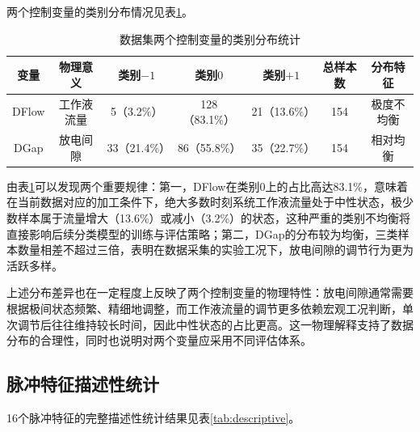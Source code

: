 \documentclass[UTF8,a4paper,12pt]{ctexart}
\begin{document}
两个控制变量的类别分布情况见表\ref{tab:distribution}。

\begin{table}[H]
\centering
\caption{数据集两个控制变量的类别分布统计}
\label{tab:distribution}
\begin{tabular}{ccccccc}
\toprule
变量 & 物理意义 & 类别$-1$ & 类别$0$ & 类别$+1$ & 总样本数 & 分布特征 \\
\midrule
DFlow & 工作液流量 & 5（3.2\%） & 128（83.1\%） & 21（13.6\%） & 154 & 极度不均衡 \\
DGap  & 放电间隙 & 33（21.4\%） & 86（55.8\%） & 35（22.7\%） & 154 & 相对均衡 \\
\bottomrule
\end{tabular}
\end{table}

由表\ref{tab:distribution}可以发现两个重要规律：第一，DFlow在类别$0$上的占比高达83.1\%，意味着在当前数据对应的加工条件下，绝大多数时刻系统工作液流量处于中性状态，极少数样本属于流量增大（13.6\%）或减小（3.2\%）的状态，这种严重的类别不均衡将直接影响后续分类模型的训练与评估策略；第二，DGap的分布较为均衡，三类样本数量相差不超过三倍，表明在数据采集的实验工况下，放电间隙的调节行为更为活跃多样。

上述分布差异也在一定程度上反映了两个控制变量的物理特性：放电间隙通常需要根据极间状态频繁、精细地调整，而工作液流量的调节更多依赖宏观工况判断，单次调节后往往维持较长时间，因此中性状态的占比更高。这一物理解释支持了数据分布的合理性，同时也说明对两个变量应采用不同评估体系。

\subsection{脉冲特征描述性统计}

16个脉冲特征的完整描述性统计结果见表\ref{tab:descriptive}。
\end{document}
